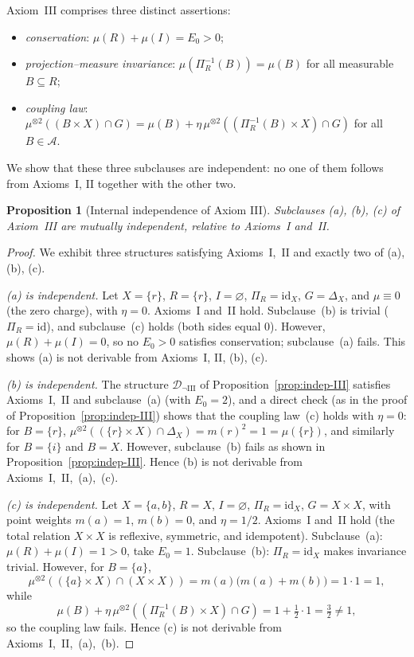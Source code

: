 \documentclass[11pt]{article}
\numberwithin{equation}{section}
\newtheorem{proposition}[theorem]{Proposition}
\theoremstyle{definition}
\begin{document}
Axiom~III comprises three distinct assertions:
\begin{itemize}[nosep]
\item[(a)] \emph{conservation}: $\mu(R)+\mu(I)=E_0>0$;
\item[(b)] \emph{projection--measure invariance}: $\mu(\Pi_R^{-1}(B))=\mu(B)$ for all measurable $B\subseteq R$;
\item[(c)] \emph{coupling law}: $\mu^{\otimes2}((B\times X)\cap G)=\mu(B)+\eta\,\mu^{\otimes2}((\Pi_R^{-1}(B)\times X)\cap G)$ for all $B\in\mathcal A$.
\end{itemize}

We show that these three subclauses are independent: no one of them follows from Axioms~I, II together with the other two.

\begin{proposition}[Internal independence of Axiom III]\label{prop:indep-III-internal}
Subclauses {\rm(a)}, {\rm(b)}, {\rm(c)} of Axiom~III are mutually independent, relative to Axioms~I and~II.
\end{proposition}

\begin{proof}
We exhibit three structures satisfying Axioms~I,~II and exactly two of {\rm(a), (b), (c)}.

\emph{(a) is independent.} Let $X=\{r\}$, $R=\{r\}$, $I=\varnothing$, $\Pi_R=\mathrm{id}_X$, $G=\Delta_X$, and $\mu\equiv 0$ (the zero charge), with $\eta=0$. Axioms~I and~II hold. Subclause~(b) is trivial ($\Pi_R=\mathrm{id}$), and subclause~(c) holds (both sides equal $0$). However, $\mu(R)+\mu(I)=0$, so no $E_0>0$ satisfies conservation; subclause~(a) fails. This shows (a) is not derivable from Axioms~I, II, (b), (c).

\emph{(b) is independent.} The structure $\mathcal D_{\neg \mathrm{III}}$ of Proposition~\ref{prop:indep-III} satisfies Axioms~I,~II and subclause~(a) (with $E_0=2$), and a direct check (as in the proof of Proposition~\ref{prop:indep-III}) shows that the coupling law~(c) holds with $\eta=0$: for $B=\{r\}$, $\mu^{\otimes2}((\{r\}\times X)\cap \Delta_X)=m(r)^2=1=\mu(\{r\})$, and similarly for $B=\{i\}$ and $B=X$. However, subclause~(b) fails as shown in Proposition~\ref{prop:indep-III}. Hence (b) is not derivable from Axioms~I,~II,~(a),~(c).

\emph{(c) is independent.} Let $X=\{a,b\}$, $R=X$, $I=\varnothing$, $\Pi_R=\mathrm{id}_X$, $G=X\times X$, with point weights $m(a)=1$, $m(b)=0$, and $\eta=1/2$. Axioms~I and~II hold (the total relation $X\times X$ is reflexive, symmetric, and idempotent). Subclause~(a): $\mu(R)+\mu(I)=1>0$, take $E_0=1$. Subclause~(b): $\Pi_R=\mathrm{id}_X$ makes invariance trivial. However, for $B=\{a\}$,
\[
\mu^{\otimes2}((\{a\}\times X)\cap (X\times X))=m(a)\bigl(m(a)+m(b)\bigr)=1\cdot 1=1,
\]
while
\[
\mu(B)+\eta\,\mu^{\otimes2}((\Pi_R^{-1}(B)\times X)\cap G)=1+\tfrac{1}{2}\cdot 1=\tfrac{3}{2}\ne 1,
\]
so the coupling law fails. Hence (c) is not derivable from Axioms~I,~II,~(a),~(b).
\end{proof}
\end{document}
